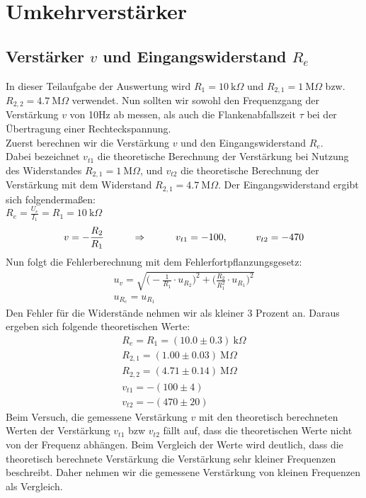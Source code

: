 

\section{Umkehrverstärker}


\subsection*{Verstärker $v$ und Eingangswiderstand $R_e$}
In dieser Teilaufgabe der Auswertung wird $R_1=10~\text{k}\Omega$ und $R_{2,1}=1~\text{M}\Omega$ bzw. $R_{2,2}=4.7~\text{M}\Omega$ verwendet. Nun sollten wir sowohl den Frequenzgang der Verstärkung $v$ von 10Hz ab messen, als auch die Flankenabfallszeit $\tau$ bei der Übertragung einer Rechteckspannung.\\
Zuerst berechnen wir die Verstärkung $v$ und den Eingangswiderstand $R_e$. \\
Dabei bezeichnet $v_{t1}$ die theoretische Berechnung der Verstärkung bei Nutzung des Widerstandes $R_{2,1}=1~\text{M}\Omega$, und $v_{t2}$ die theoretische Berechnung der Verstärkung mit dem Widerstand $R_{2,1}=4.7~\text{M}\Omega$. Der Eingangswiderstand ergibt sich folgendermaßen: \\
$R_e=\frac{U_e}{I_1}=R_1=10~\text{k}\Omega$
\begin{equation}
    v=-\frac{R_2}{R_1} \hspace*{1cm} \Rightarrow \hspace*{1cm} v_{t1}= -100, \hspace*{1cm} v_{t2}=-470
\end{equation}
Nun folgt die Fehlerberechnung mit dem Fehlerfortpflanzungsgesetz:
\begin{gather}
    u_{v}=\sqrt{\bigl(-\frac{1}{R_1}\cdot u_{R_2}\bigr)^2 + {\bigl(\frac{R_2}{R_1^2}\cdot u_{R_1}\bigr)^2}}\\
    u_{R_e}=u_{R_1}
\end{gather}
Den Fehler für die Widerstände nehmen wir als kleiner 3 Prozent an. Daraus ergeben sich folgende theoretischen Werte:
\begin{gather}
\boxed{R_e=R_1=(10.0\pm 0.3)~\text{k}\Omega}\\
R_{2,1}=(1.00\pm 0.03)~\text{M}\Omega\\
R_{2,2}=(4.71\pm 0.14)~\text{M}\Omega\\
v_{t1}=-(100\pm4)\\
v_{t2}=-(470\pm20)
\end{gather}
Beim Versuch, die gemessene Verstärkung $v$ mit den theoretisch berechneten Werten der Verstärkung  $v_{t1}$ bzw $v_{t2}$ fällt auf, dass die theoretischen Werte nicht von der Frequenz abhängen. Beim Vergleich der Werte wird deutlich, dass die theoretisch berechnete Verstärkung die Verstärkung sehr kleiner Frequenzen beschreibt. Daher nehmen wir die gemessene Verstärkung von kleinen Frequenzen als Vergleich. 
